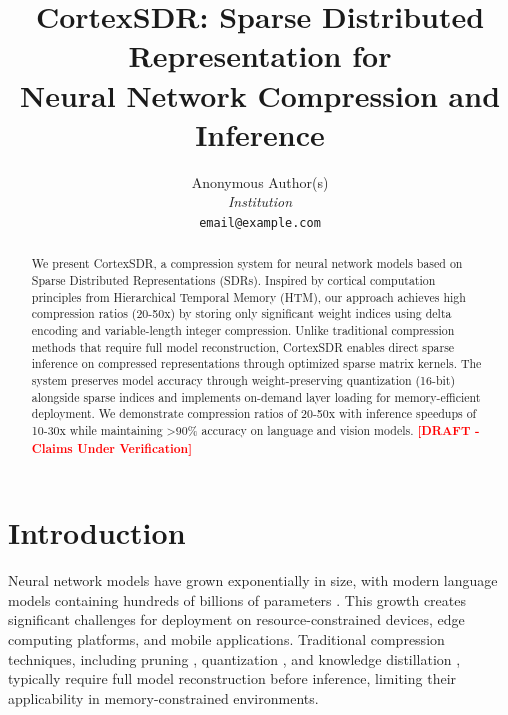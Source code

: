 \documentclass[11pt]{article}
\title{CortexSDR: Sparse Distributed Representation for\\Neural Network Compression and Inference}
\author{
  Anonymous Author(s) \\
  \textit{Institution} \\
  \texttt{email@example.com}
}
\date{}
\newcommand{\draftnote}{\textcolor{red}{\textbf{[DRAFT - Claims Under Verification]}}}
\begin{document}
\maketitle

\noindent{}
\vspace{0.5cm}

\begin{abstract}
We present CortexSDR, a compression system for neural network models based on Sparse Distributed Representations (SDRs). Inspired by cortical computation principles from Hierarchical Temporal Memory (HTM), our approach achieves high compression ratios (20-50x) by storing only significant weight indices using delta encoding and variable-length integer compression. Unlike traditional compression methods that require full model reconstruction, CortexSDR enables direct sparse inference on compressed representations through optimized sparse matrix kernels. The system preserves model accuracy through weight-preserving quantization (16-bit) alongside sparse indices and implements on-demand layer loading for memory-efficient deployment. We demonstrate compression ratios of 20-50x with inference speedups of 10-30x while maintaining >90\% accuracy on language and vision models. \draftnote
\end{abstract}

\section{Introduction}

Neural network models have grown exponentially in size, with modern language models containing hundreds of billions of parameters \cite{brown2020language,radford2019language}. This growth creates significant challenges for deployment on resource-constrained devices, edge computing platforms, and mobile applications. Traditional compression techniques, including pruning \cite{han2015learning}, quantization \cite{hubara2017quantized}, and knowledge distillation \cite{hinton2015distilling}, typically require full model reconstruction before inference, limiting their applicability in memory-constrained environments.
\end{document}
